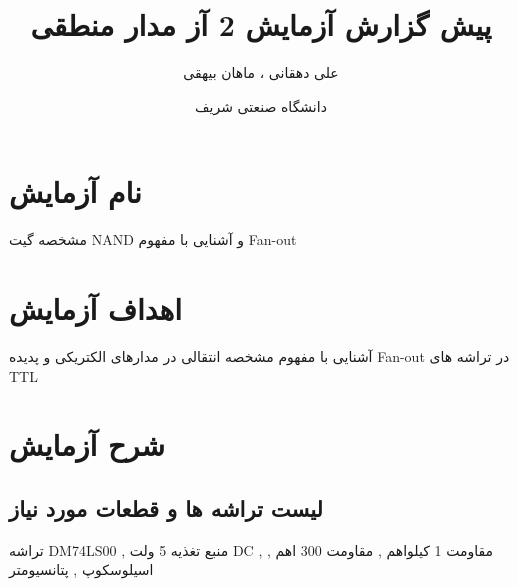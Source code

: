 \documentclass[twoside]{article}
\title{\Huge پیش گزارش آزمایش 2 آز مدار منطقی }
\author{\Large علی دهقانی ، ماهان بیهقی}
\date{دانشگاه صنعتی شریف}
\begin{document}
	\maketitle
	\newpage
	\section*{نام آزمایش}
	مشخصه گیت NAND و آشنایی با مفهوم Fan-out
	
	\section*{اهداف آزمایش}
	آشنایی با مفهوم مشخصه انتقالی در مدارهای الکتریکی و پدیده Fan-out در تراشه های TTL
	
	\section*{شرح آزمایش}
		
		\subsection*{لیست تراشه ها و قطعات مورد نیاز}
		تراشه DM74LS00 , منبع تغذیه 5 ولت DC , مقاومت 1 کیلواهم , مقاومت 300 اهم ,  اسیلوسکوپ , پتانسیومتر
		
\end{document}
